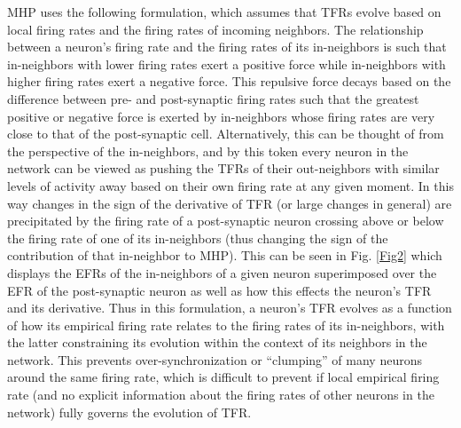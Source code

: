 \documentclass[10pt,letterpaper]{article}
\begin{document}
MHP uses the following formulation, which assumes that TFRs evolve based on local firing rates and the firing rates of incoming neighbors. The relationship between a neuron's firing rate and the firing rates of its in-neighbors is such that in-neighbors with lower firing rates exert a positive force while in-neighbors with higher firing rates exert a negative force. This repulsive force decays based on the difference between pre- and post-synaptic firing rates such that the greatest positive or negative force is exerted by in-neighbors whose firing rates are very close to that of the post-synaptic cell. Alternatively, this can be thought of from the perspective of the in-neighbors, and by this token every neuron in the network can be viewed as pushing the TFRs of their out-neighbors with similar levels of activity away based on their own firing rate at any given moment. In this way changes in the sign of the derivative of TFR (or large changes in general) are precipitated by the firing rate of a  post-synaptic neuron crossing above or below the firing rate of one of its in-neighbors (thus changing the sign of the contribution of that in-neighbor to MHP). This can be seen in Fig. \ref{Fig2} which displays the EFRs of the in-neighbors of a given neuron superimposed over the EFR of the post-synaptic neuron as well as how this effects the neuron's TFR and its derivative. Thus in this formulation, a neuron's TFR evolves as a function of how its empirical firing rate relates to the firing rates of its in-neighbors, with the latter constraining its evolution within the context of its neighbors in the network. This prevents over-synchronization or ``clumping'' of many neurons around the same firing rate, which is difficult to prevent if local empirical firing rate (and no explicit information about the firing rates of other neurons in the network) fully governs the evolution of TFR. 
\end{document}

